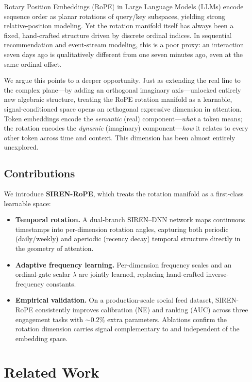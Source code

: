 \documentclass{article}
\begin{document}
Rotary Position Embeddings (RoPE) \citep{su2024roformer} in Large Language Models (LLMs) 
encode sequence order as planar rotations of query/key subspaces, yielding strong
relative-position modeling. Yet the rotation manifold itself has always been a
fixed, hand-crafted structure driven by discrete ordinal indices. In sequential
recommendation and event-stream modeling, this is a poor proxy: an interaction
seven days ago is qualitatively different from one seven minutes ago, even at the same ordinal offset.

We argue this points to a deeper opportunity. Just as extending the real line to the complex plane---by adding an orthogonal imaginary axis---unlocked entirely new algebraic structure, treating the RoPE rotation manifold as a learnable, signal-conditioned space opens an orthogonal expressive dimension in attention. Token embeddings encode the \emph{semantic} (real) component---\emph{what} a token means; the rotation encodes the \emph{dynamic} (imaginary) component---\emph{how} it relates to every other token across time and context. This dimension has been almost entirely unexplored.

\subsection{Contributions}

We introduce \textbf{SIREN-RoPE}, which treats the rotation manifold as a first-class learnable space:
\begin{itemize}
  \item \textbf{Temporal rotation.} A dual-branch SIREN--DNN network maps continuous timestamps into per-dimension rotation angles, capturing both periodic (daily/weekly) and aperiodic (recency decay) temporal structure directly in the geometry of attention.
  \item \textbf{Adaptive frequency learning.} Per-dimension frequency scales and an ordinal-gate scalar $\lambda$ are jointly learned, replacing hand-crafted inverse-frequency constants.
  \item \textbf{Empirical validation.} On a production-scale social feed dataset, SIREN-RoPE consistently improves calibration (NE) and ranking (AUC) across three engagement tasks with ${\sim}0.2\%$ extra parameters. Ablations confirm the rotation dimension carries signal complementary to and independent of the embedding space.
\end{itemize}

\section{Related Work}
\end{document}
